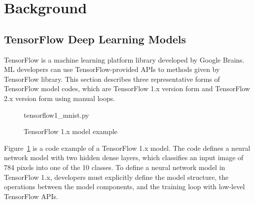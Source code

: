 \section{Background}\label{sec:background}
\subsection{TensorFlow Deep Learning Models}

TensorFlow\cite{tensorflow} is a machine learning platform library
developed by Google Brains.
ML developers can use TensorFlow-provided APIs to 
methods given by TensorFlow library.
This section describes three representative forms of TensorFlow
model codes, which are TensorFlow 1.x version form 
and TensorFlow 2.x version form using manual loops.

\begin{figure}[ht!]

{tensorflow1_mnist.py}
  \caption{TensorFlow 1.x model example}
\label{fig:back:tf1}
\end{figure}

Figure~\ref{fig:back:tf1} is a code example of a TensorFlow 1.x model.
The code defines a neural network model with two hidden dense layers,
which classifies an input image of 784 pixels into one of the 10 classes.
To define a neural network model in TensorFlow 1.x, 
developers must explicitly define the model structure,
the operations between the model components, 
and the training loop with low-level TensorFlow APIs.

